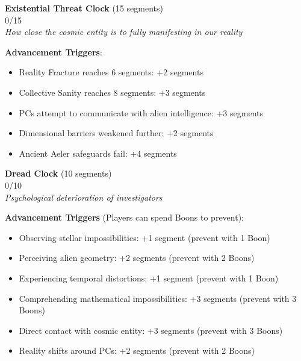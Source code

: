 \documentclass[11pt]{article}
\newcommand{\clocksegment}{\textbullet}
\begin{document}
\begin{center}
\textbf{Existential Threat Clock} (15 segments)\\
\fbox{\clocksegment\clocksegment\clocksegment\clocksegment\clocksegment\clocksegment\clocksegment\clocksegment\clocksegment\clocksegment\clocksegment\clocksegment\clocksegment\clocksegment\clocksegment} 0/15\\
\textit{How close the cosmic entity is to fully manifesting in our reality}
\end{center}

\textbf{Advancement Triggers}:
\begin{itemize}[leftmargin=*]
\item Reality Fracture reaches 6 segments: +2 segments
\item Collective Sanity reaches 8 segments: +3 segments
\item PCs attempt to communicate with alien intelligence: +3 segments
\item Dimensional barriers weakened further: +2 segments
\item Ancient Aeler safeguards fail: +4 segments
\end{itemize}

\begin{center}
\textbf{Dread Clock} (10 segments)\\
\fbox{\clocksegment\clocksegment\clocksegment\clocksegment\clocksegment\clocksegment\clocksegment\clocksegment\clocksegment\clocksegment} 0/10\\
\textit{Psychological deterioration of investigators}
\end{center}

\textbf{Advancement Triggers} (Players can spend Boons to prevent):
\begin{itemize}[leftmargin=*]
\item Observing stellar impossibilities: +1 segment (prevent with 1 Boon)
\item Perceiving alien geometry: +2 segments (prevent with 2 Boons)
\item Experiencing temporal distortions: +1 segment (prevent with 1 Boon)
\item Comprehending mathematical impossibilities: +3 segments (prevent with 3 Boons)
\item Direct contact with cosmic entity: +3 segments (prevent with 3 Boons)
\item Reality shifts around PCs: +2 segments (prevent with 2 Boons)
\end{itemize}
\end{document}
